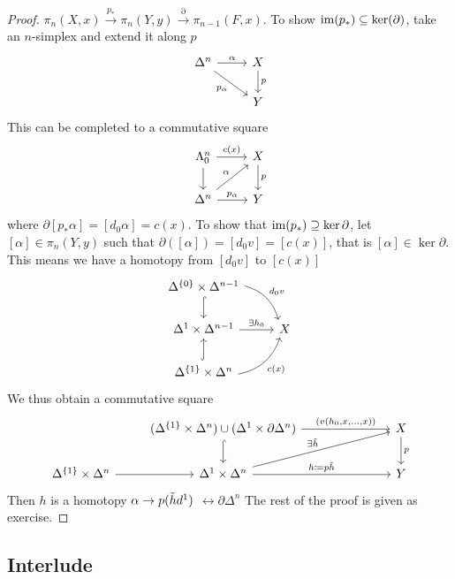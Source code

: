 \begin{proof}
    $\pi_n(X,x) \xrightarrow{p_*} \pi_n(Y,y) \xrightarrow{\partial} \pi_{n-1}(F,x)$.
    To show $\operatorname{im}(p_*) \subseteq  \ker(\partial)$, take an $n$-simplex and extend it along $p$
    \[
    \begin{tikzcd}
        \Delta^n
        \ar[r,"\alpha"]
        \ar[rd, "p_{\alpha}"']
        &
        X
        \ar[d,"p"]
        \\
        &
        Y
    \end{tikzcd}
    \]
    This can be completed to a commutative square 
    \[
        \begin{tikzcd}
        \Lambda_0^n
        \dar
        \ar[r,"c(x)"]
        &
        X
        \ar[d,"p"]
        \\
        \Delta^n
        \ar[ru, "\alpha"]
        \ar[r, "p_{\alpha}"]
        &
        Y
        \end{tikzcd}
    \]
    where $\partial[p_*\alpha]=[d_0\alpha]=c(x)$.
    To show that $\operatorname{im}(p_*) \supseteq \ker \partial$, let $[\alpha] \in \pi_n(Y,y)$ such that $\partial([\alpha])=[d_0v]=[c(x)]$, that is $[\alpha] \in \ker \partial$.
    This means we have a homotopy from $[d_0v]$ to $[c(x)]$
    \[
    \begin{tikzcd}
        \Delta^{\{0\}} \times \Delta^{n-1}
        \ar[d, hook]
        \ar[dr, bend left, "d_0v"]
        &
        \\
        \Delta^1 \times \Delta^{n-1}
        \ar[r, "\exists h_0"]
        &
        X
        \\
        \Delta^{\{1\}} \times \Delta^n
        \ar[u, hook]
        \ar[ru, bend right, "c(x)"']
    \end{tikzcd}
    \]
    We thus obtain a commutative square
    \[
    \begin{tikzcd}
        &
        (\Delta^{\{1\}} \times \Delta^n) \cup ( \Delta^1 \times \partial \Delta^n)
        \ar[rrr, "{(v ( h_0, x , \dotsc , x ))}"]
        \ar[d, hook]
        &&&
        X
        \ar[d, "p"]
        \\
        \Delta^{\{1\}} \times \Delta^n
        \ar[r]
        &
        \Delta^1 \times \Delta^n
        \ar[rrru, "\exists \Tilde{h}"]
        \ar[rrr, "h\coloneqq p \Tilde{h}"]
        &&&
        Y
    \end{tikzcd}
    \]
    Then $h$ is a homotopy $\alpha \to p( \Tilde{h}d^1)$ $\rel \partial\Delta^n$
    The rest of the proof is given as exercise.
\end{proof}

\subsection{Interlude}

